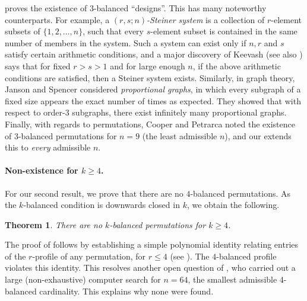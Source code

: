 \documentclass{article}
\theoremstyle{remark}
\theoremstyle{plain}
\newtheorem{thm}{Theorem}
\begin{document}
 proves the existence of $3$-balanced ``designs''.
This has many noteworthy counterparts.
For example, a \emph{$(r,s; n)$-Steiner system} is a collection
 of $r$-element subsets of $\{1, 2, \dots, n\}$, such that every
 $s$-element subset is contained in the same number of members in the system.
 Such a system can exist only if $n, r$ and $s$ satisfy certain arithmetic conditions,
 and a major discovery of Keevash \cite{keevash2014existence} (see also \cite{glock2016existence}) says that
 for fixed $r>s>1$ and for large enough $n$, if the above arithmetic conditions
 are satisfied, then a Steiner system exists.
 Similarly, in graph theory, Janson and Spencer \cite{janson1992probabilistic} considered \textit{proportional graphs},
 in which every subgraph of a fixed size appears the exact number of times as expected. 
 They showed that with respect to order-$3$ subgraphs, there exist infinitely many proportional graphs.
 Finally, with regards to permutations,
 Cooper and Petrarca \cite{cooper2008symmetric} noted the existence of $3$-balanced permutations for $n=9$ (the least admissible $n$), and our  extends this to \textit{every} admissible $n$.

\paragraph{Non-existence for $k \ge 4$.} For our second result, we prove that there are no $4$-balanced permutations. As the $k$-balanced condition is downwards closed in $k$, we obtain the following.

\begin{thm}
    \label{thm_no_4_balanced}
    There are no $k$-balanced permutations for $k\geq 4$.
\end{thm}

The proof of  follows by establishing a simple polynomial identity relating entries of the $r$-profile of any permutation, for $r \le 4$ (see ). The $4$-balanced profile violates this
identity. This resolves another open question of \cite{cooper2008symmetric}, who carried out a large (non-exhaustive) computer search for $n=64$, the smallest admissible $4$-balanced cardinality. This explains why none were found.
\end{document}
